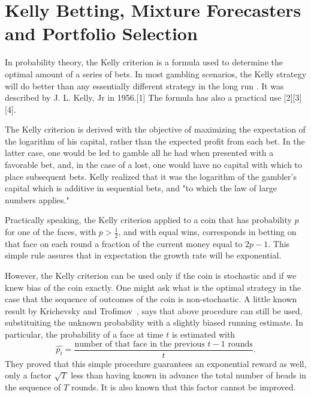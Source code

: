 \section{Kelly Betting, Mixture Forecasters and Portfolio Selection}

In probability theory, the Kelly criterion is a formula used to determine the optimal amount of a series of bets. In most gambling scenarios, the Kelly strategy will do better than any essentially different strategy in the long run \cite{}. It was described by J. L. Kelly, Jr in 1956.[1] The formula has also a practical use [2][3][4].

The Kelly criterion is derived with the objective of maximizing the expectation of the logarithm of his capital, rather than the expected profit from each bet. In the latter case, one would be led to gamble all he had when presented with a favorable bet, and, in the case of a lost, one would have no capital with which to place subsequent bets. Kelly realized that it was the logarithm of the gambler's capital which is additive in sequential bets, and "to which the law of large numbers applies."

Practically speaking, the Kelly criterion applied to a coin that has probability $p$ for one of the faces, with $p> \frac{1}{2}$, and with equal wins, corresponds in betting on that face on each round a fraction of the current money equal to $2p-1$. This simple rule assures that in expectation the growth rate will be exponential.

However, the Kelly criterion can be used only if the coin is stochastic and if we knew bias of the coin exactly. One might ask what is the optimal strategy in the case that the sequence of outcomes of the coin is non-stochastic.
A little known result by Krichevsky and Trofimov~\cite{}, says that above procedure can still be used, substituiting the  unknown probability with a slightly biased running estimate. In particular, the probability of a face at time $t$ is estimated with 
\[
\hat{p_t}=\frac{\text{number of that face in the previous } t-1 \text{ rounds}}{t}.
\]
They proved that this simple procedure guarantees an exponential reward as well, only a factor $\sqrt{T}$ less than having known in advance the total number of heads in the sequence of $T$ rounds. It is also known that this factor cannot be improved.


